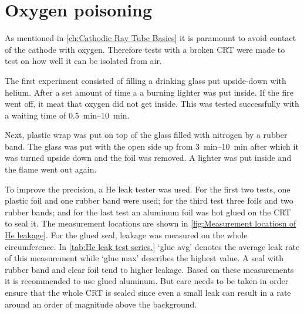 \section{Oxygen poisoning}
\label{sec:Oxygen poisoning}


As mentioned in \cref{ch:Cathodic Ray Tube Basics} it is paramount to avoid contact of the cathode with oxygen. Therefore tests with a broken CRT were made to test on how well it can be isolated from air.

The first experiment consisted of filling a drinking glass put upside-down with helium. After a set amount of time a a burning lighter was put inside. If the fire went off, it meat that oxygen did not get inside. This was tested successfully with a waiting time of \SIrange{0.5}{10}{\minute}.

Next, plastic wrap was put on top of the glass filled with nitrogen by a rubber band. The glass was put with the open side up from \SIrange{3}{10}{\minute} after which it was turned upside down and the foil was removed. A lighter was put inside and the flame went out again.

To improve the precision, a He leak tester was used. For the first two tests, one plastic foil and one rubber band were used; for the third test three foils and two rubber bands; and for the last test an aluminum foil was hot glued on the CRT to seal it. The measurement locations are shown in \cref{fig:Measurement locatiosn of He leakage}. For the glued seal, leakage was measured on the whole circumference. In \cref{tab:He leak test series.} `glue avg' denotes the average leak rate of this measurement while `glue max' describes the highest value. A seal with rubber band and clear foil tend to higher leakage. Based on these measurements it is recommended to use glued aluminum. But care needs to be taken in order ensure that the whole CRT is sealed since even a small leak can result in a rate around an order of magnitude above the background.

